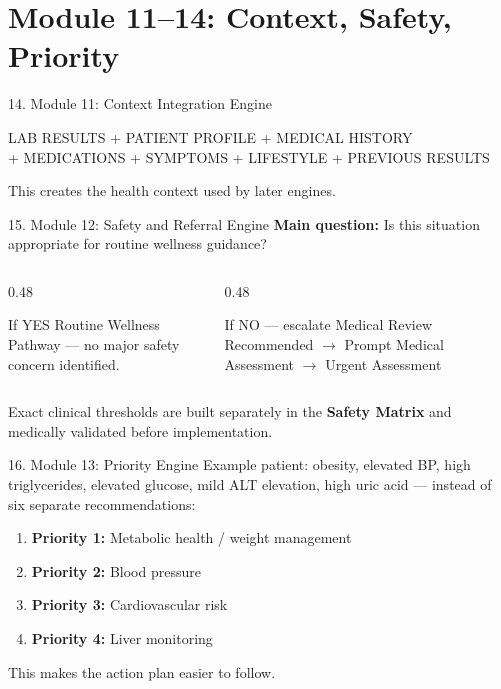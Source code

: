 \documentclass[10pt,aspectratio=169]{beamer}
\begin{document}
\section{Module 11--14: Context, Safety, Priority}

\begin{frame}{14. Module 11: Context Integration Engine}
\begin{center}
\large
LAB RESULTS + PATIENT PROFILE + MEDICAL HISTORY \\[4pt]
+ MEDICATIONS + SYMPTOMS + LIFESTYLE + PREVIOUS RESULTS
\end{center}
\vfill
\centering This creates the health context used by later engines.
\end{frame}

\begin{frame}{15. Module 12: Safety and Referral Engine}
\textbf{Main question:} Is this situation appropriate for routine wellness guidance?
\vspace{8pt}
\begin{columns}[T]
\begin{column}{0.48\textwidth}
\begin{block}{If YES}
Routine Wellness Pathway --- no major safety concern identified.
\end{block}
\end{column}
\begin{column}{0.48\textwidth}
\begin{alertblock}{If NO --- escalate}
\scriptsize Medical Review Recommended $\to$ Prompt Medical Assessment $\to$ Urgent Assessment
\end{alertblock}
\end{column}
\end{columns}
\vfill
\footnotesize Exact clinical thresholds are built separately in the \textbf{Safety Matrix} and medically validated before implementation.
\end{frame}

\begin{frame}{16. Module 13: Priority Engine}
\footnotesize Example patient: obesity, elevated BP, high triglycerides, elevated glucose, mild ALT elevation, high uric acid --- instead of six separate recommendations:
\vspace{6pt}
\begin{enumerate}
\item \textbf{Priority 1:} Metabolic health / weight management
\item \textbf{Priority 2:} Blood pressure
\item \textbf{Priority 3:} Cardiovascular risk
\item \textbf{Priority 4:} Liver monitoring
\end{enumerate}
\vfill
This makes the action plan easier to follow.
\end{frame}
\end{document}
